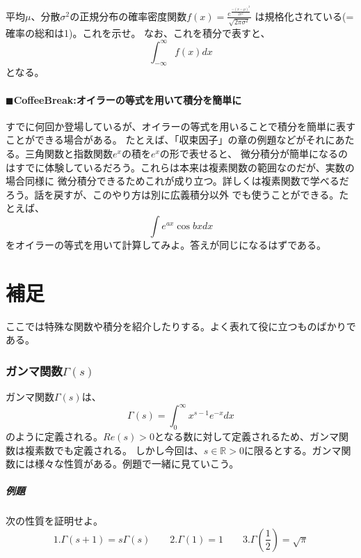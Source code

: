 \documentclass[a4j,dvipdfmx]{jsarticle}
\begin{document}
平均$\mu$、分散$\sigma^2$の正規分布の確率密度関数$\displaystyle f(x)=\frac{e^{\frac{-(x-\mu)^2}{2\sigma^2}}}{\sqrt{2\pi\sigma^2}}$ は規格化されている(=確率の総和は1)。これを示せ。
なお、これを積分で表すと、
\begin{equation*}
    \int_{-\infty}^{\infty}f(x)dx
\end{equation*}
となる。\\
\hrulefill
\subsection{$\blacksquare$CoffeeBreak:オイラーの等式を用いて積分を簡単に}
\begin{screen}
    すでに何回か登場しているが、オイラーの等式を用いることで積分を簡単に表すことができる場合がある。
    たとえば、「収束因子」の章の例題などがそれにあたる。三角関数と指数関数$e^x$の積を$e^{x}$の形で表せると、
    微分積分が簡単になるのはすでに体験しているだろう。これらは本来は複素関数の範囲なのだが、実数の場合同様に
    微分積分できるためこれが成り立つ。詳しくは複素関数で学べるだろう。話を戻すが、このやり方は別に広義積分以外
    でも使うことができる。たとえば、
    \begin{equation*}
        \int e^{ax} \cos bx dx
    \end{equation*}
    をオイラーの等式を用いて計算してみよ。答えが同じになるはずである。
\end{screen}
\newpage
\part{補足}
ここでは特殊な関数や積分を紹介したりする。よく表れて役に立つものばかりである。
\section{ガンマ関数$\Gamma(s)$}
ガンマ関数$\Gamma(s)$は、
\begin{equation*}
    \Gamma(s)=\int_0^\infty x^{s-1}e^{-x}dx
\end{equation*}
のように定義される。$Re(s)>0$となる数に対して定義されるため、ガンマ関数は複素数でも定義される。
しかし今回は、$s\in \mathbb{R}>0$に限るとする。ガンマ関数には様々な性質がある。例題で一緒に見ていこう。
\subsubsection*{例題}
次の性質を証明せよ。
\begin{equation*}
    1.\Gamma(s+1)=s\Gamma(s)\qquad 2.\Gamma(1)=1\qquad 3.\Gamma(\frac{1}{2})=\sqrt{\pi}
\end{equation*}
\end{document}
